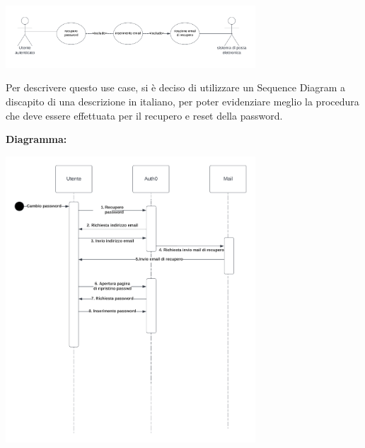 \begin{listaPersonale}[UC]{}
\begin{listaPersonale2}[UC] {}
    \end{listaPersonale2}

    \newpage

    \begin{center}
        \includegraphics[width=0.7\textwidth]{img/Diagrammi/UseCases/RecuperoPassword.png}
    \end{center}
    Per descrivere questo use case, si è deciso di utilizzare un Sequence Diagram a discapito di una descrizione in italiano, per poter evidenziare meglio la procedura che deve essere effettuata per il recupero e reset della password.

    \textbf{Diagramma:}
    \begin{center}
        \includegraphics[width=0.7\textwidth]{img/Diagrammi/DS/DS_RecuperoPassword.png}
    \end{center}

\end{listaPersonale}
